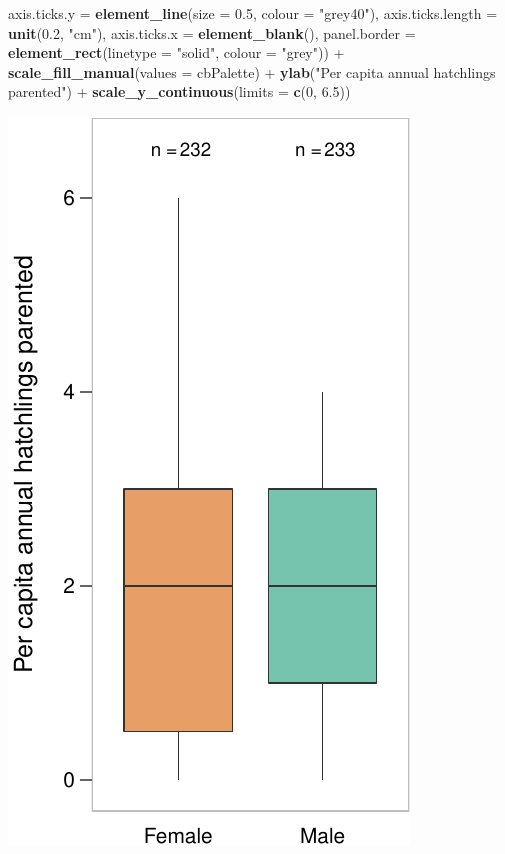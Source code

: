 \documentclass[]{article}
\newenvironment{Shaded}{\begin{snugshade}}{\end{snugshade}}
\newcommand{\KeywordTok}[1]{\textcolor[rgb]{0.13,0.29,0.53}{\textbf{{#1}}}}
\newcommand{\DataTypeTok}[1]{\textcolor[rgb]{0.13,0.29,0.53}{{#1}}}
\newcommand{\DecValTok}[1]{\textcolor[rgb]{0.00,0.00,0.81}{{#1}}}
\newcommand{\FloatTok}[1]{\textcolor[rgb]{0.00,0.00,0.81}{{#1}}}
\newcommand{\StringTok}[1]{\textcolor[rgb]{0.31,0.60,0.02}{{#1}}}
\newcommand{\NormalTok}[1]{{#1}}
\begin{document}
\begin{Shaded}
\begin{Highlighting}[]
        \DataTypeTok{axis.ticks.y =} \KeywordTok{element_line}\NormalTok{(}\DataTypeTok{size =} \FloatTok{0.5}\NormalTok{, }\DataTypeTok{colour =} \StringTok{"grey40"}\NormalTok{),}
        \DataTypeTok{axis.ticks.length =} \KeywordTok{unit}\NormalTok{(}\FloatTok{0.2}\NormalTok{, }\StringTok{"cm"}\NormalTok{),}
        \DataTypeTok{axis.ticks.x =} \KeywordTok{element_blank}\NormalTok{(),}
        \DataTypeTok{panel.border =} \KeywordTok{element_rect}\NormalTok{(}\DataTypeTok{linetype =} \StringTok{"solid"}\NormalTok{, }\DataTypeTok{colour =} \StringTok{"grey"}\NormalTok{)) +}
\StringTok{  }\KeywordTok{scale_fill_manual}\NormalTok{(}\DataTypeTok{values =} \NormalTok{cbPalette) +}
\StringTok{  }\KeywordTok{ylab}\NormalTok{(}\StringTok{"Per capita annual hatchlings parented"}\NormalTok{) +}
\StringTok{  }\KeywordTok{scale_y_continuous}\NormalTok{(}\DataTypeTok{limits =} \KeywordTok{c}\NormalTok{(}\DecValTok{0}\NormalTok{, }\FloatTok{6.5}\NormalTok{))}
\end{Highlighting}
\end{Shaded}

\begin{center}\includegraphics{Ceuta_ASR_Matrix_Modeling_files/figure-latex/unnamed-chunk-17-1} \end{center}
\end{document}
